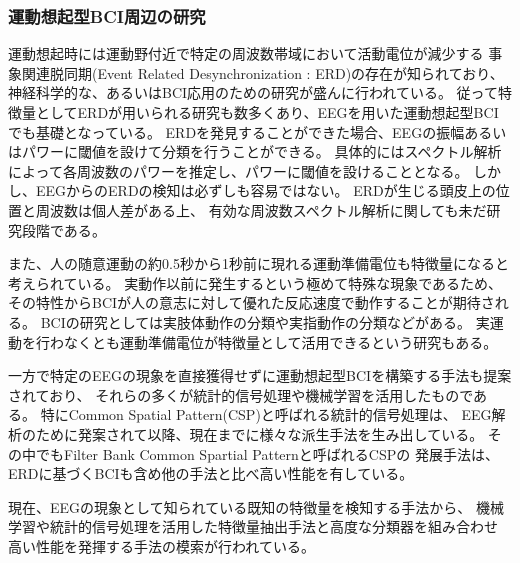 \subsubsection{運動想起型BCI周辺の研究}
運動想起時には運動野付近で特定の周波数帯域において活動電位が減少する
事象関連脱同期(Event Related Desynchronization : ERD)の存在が知られており、
神経科学的な、あるいはBCI応用のための研究が盛んに行われている\cite{ERDとERS,ERDリハビリ,運動フィードバック}。
従って特徴量としてERDが用いられる研究も数多くあり、EEGを用いた運動想起型BCIでも基礎となっている\cite{プリミティブERD,Beta波によるBCI,waveletFSVM}。
ERDを発見することができた場合、EEGの振幅あるいはパワーに閾値を設けて分類を行うことができる。
具体的にはスペクトル解析によって各周波数のパワーを推定し、パワーに閾値を設けることとなる。
しかし、EEGからのERDの検知は必ずしも容易ではない。
ERDが生じる頭皮上の位置と周波数は個人差がある上、
有効な周波数スペクトル解析に関しても未だ研究段階である\cite{時間周波数解析の比較}。

また、人の随意運動の約0.5秒から1秒前に現れる運動準備電位も特徴量になると考えられている。
実動作以前に発生するという極めて特殊な現象であるため、
その特性からBCIが人の意志に対して優れた反応速度で動作することが期待される。
BCIの研究としては実肢体動作の分類\cite{運動準備電位肢体}や実指動作の分類\cite{運動準備電位指}などがある。
実運動を行わなくとも運動準備電位が特徴量として活用できるという研究\cite{運動準備電位想起,運動準備電位想起2}もある。

一方で特定のEEGの現象を直接獲得せずに運動想起型BCIを構築する手法も提案されており、
それらの多くが統計的信号処理や機械学習を活用したものである。
特にCommon Spatial Pattern(CSP)と呼ばれる統計的信号処理\cite{CSP1990,CSP1999}は、
EEG解析のために発案されて以降、現在までに様々な派生手法を生み出している\cite{csssp,正則化CSP,カーネルCSP,cvscsp}。
その中でもFilter Bank Common Spartial Pattern\cite{fbcsp}と呼ばれるCSPの
発展手法は、ERDに基づくBCIも含め他の手法と比べ高い性能を有している。

現在、EEGの現象として知られている既知の特徴量を検知する手法から、
機械学習や統計的信号処理を活用した特徴量抽出手法と高度な分類器を組み合わせ
高い性能を発揮する手法の模索が行われている\cite{BCIの比較}。
